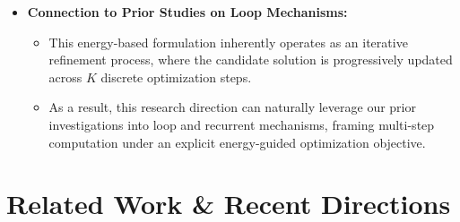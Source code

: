 \documentclass[11pt,a4paper]{article}
\begin{document}
\begin{itemize}[leftmargin=1.5em]
    \item \textbf{Connection to Prior Studies on Loop Mechanisms:}
    \begin{itemize}[leftmargin=1.2em]
        \item This energy-based formulation inherently operates as an iterative refinement process, where the candidate solution is progressively updated across $K$ discrete optimization steps.
        \item As a result, this research direction can naturally leverage our prior investigations into loop and recurrent mechanisms, framing multi-step computation under an explicit energy-guided optimization objective.
    \end{itemize}
\end{itemize}

\section{Related Work \& Recent Directions}
\label{sec:related_work}
\end{document}
